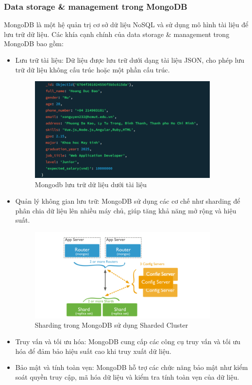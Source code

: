 \subsubsection{Data storage \& management trong MongoDB}
\indent MongoDB là một hệ quản trị cơ sở dữ liệu NoSQL và sử dụng mô hình tài liệu để lưu trữ dữ liệu. Các khía cạnh chính của data storage \& management trong MongoDB bao gồm:
\begin{itemize}
    \item Lưu trữ tài liệu: Dữ liệu được lưu trữ dưới dạng tài liệu JSON, cho phép lưu trữ dữ liệu không cấu trúc hoặc một phần cấu trúc. 
    \begin{figure}[H]
        \centering
        \includegraphics[width=0.9\textwidth]{Image/2.1.3a.png}
        \caption{Mongodb lưu trữ dữ liệu dưới tài liệu}
    \end{figure}
    \item Quản lý không gian lưu trữ: MongoDB sử dụng các cơ chế như sharding để phân chia dữ liệu lên nhiều máy chủ, giúp tăng khả năng mở rộng và hiệu suất.
    \begin{figure}[H]
        \centering
        \includegraphics[width=0.9\textwidth]{Image/Sharding.png}
        \caption{Sharding trong MongoDB sử dụng Sharded Cluster}
    \end{figure}
    \item Truy vấn và tối ưu hóa: MongoDB cung cấp các công cụ truy vấn và tối ưu hóa để đảm bảo hiệu suất cao khi truy xuất dữ liệu.
    \item Bảo mật và tính toàn vẹn: MongoDB hỗ trợ các chức năng bảo mật như kiểm soát quyền truy cập, mã hóa dữ liệu và kiểm tra tính toàn vẹn của dữ liệu.
\end{itemize}

